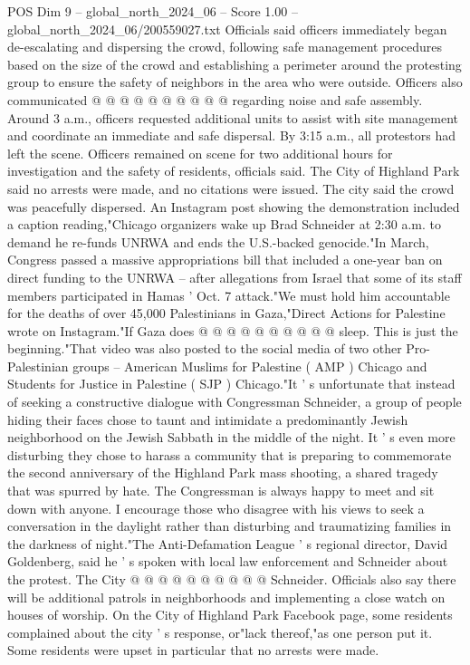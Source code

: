 \begin{textsample}{POS Dim 9 – global\_north\_2024\_06 – Score 1.00 – global\_north\_2024\_06/200559027.txt}
Officials said officers immediately began de-escalating and dispersing the crowd, following safe management procedures based on the size of the crowd and establishing a perimeter around the protesting group to ensure the safety of neighbors in the area who were outside.
Officers also communicated @ @ @ @ @ @ @ @ @ @ regarding noise and safe assembly.
Around 3 a.m., officers requested additional units to assist with site management and coordinate an immediate and safe dispersal.
By 3:15 a.m., all protestors had left the scene.
Officers remained on scene for two additional hours for investigation and the safety of residents, officials said.
The City of Highland Park said no arrests were made, and no citations were issued.
The city said the crowd was peacefully dispersed.
An Instagram post showing the demonstration included a caption reading,"Chicago organizers wake up Brad Schneider at 2:30 a.m. to demand he re-funds UNRWA and ends the U.S.-backed genocide."In March, Congress passed a massive appropriations bill that included a one-year ban on direct funding to the UNRWA -- after allegations from Israel that some of its staff members participated in Hamas ' Oct. 7 attack."We must hold him accountable for the deaths of over 45,000 Palestinians in Gaza,"Direct Actions for Palestine wrote on Instagram."If Gaza does @ @ @ @ @ @ @ @ @ @ sleep.
This is just the beginning."That video was also posted to the social media of two other Pro-Palestinian groups -- American Muslims for Palestine ( AMP ) Chicago and Students for Justice in Palestine ( SJP ) Chicago."It ' s unfortunate that instead of seeking a constructive dialogue with Congressman Schneider, a group of people hiding their faces chose to taunt and intimidate a predominantly Jewish neighborhood on the Jewish Sabbath in the middle of the night.
It ' s even more disturbing they chose to harass a community that is preparing to commemorate the second anniversary of the Highland Park mass shooting, a shared tragedy that was spurred by hate.
The Congressman is always happy to meet and sit down with anyone.
I encourage those who disagree with his views to seek a conversation in the daylight rather than disturbing and traumatizing families in the darkness of night."The Anti-Defamation League ' s regional director, David Goldenberg, said he ' s spoken with local law enforcement and Schneider about the protest.
The City @ @ @ @ @ @ @ @ @ @ Schneider.
Officials also say there will be additional patrols in neighborhoods and implementing a close watch on houses of worship.
On the City of Highland Park Facebook page, some residents complained about the city ' s response, or"lack thereof,"as one person put it.
Some residents were upset in particular that no arrests were made.

\end{textsample}
